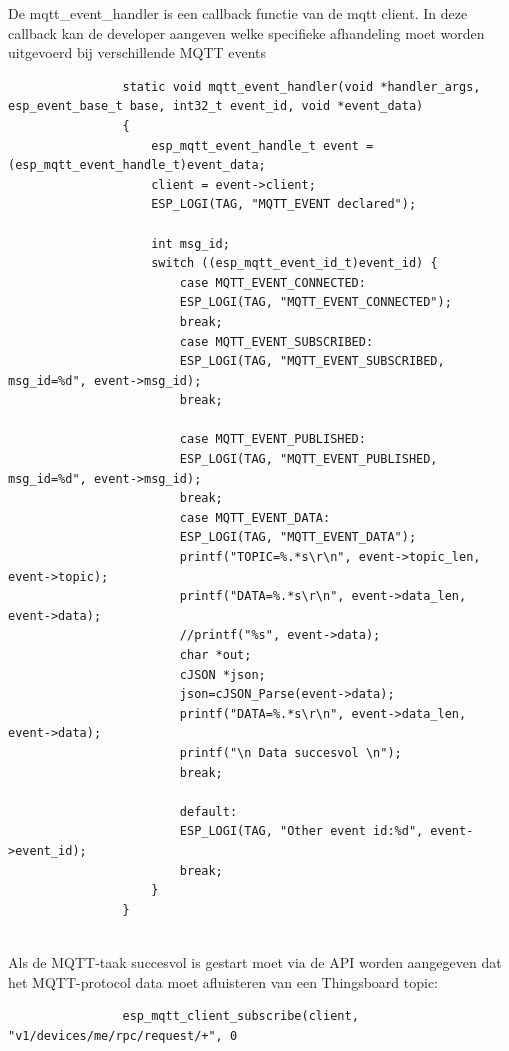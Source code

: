 		
		
		De mqtt_event_handler is een callback functie van de mqtt client. In deze callback kan de developer aangeven welke specifieke afhandeling moet worden uitgevoerd bij verschillende MQTT events
		
		
		
		\lstset{language=java}
		
		\begin{Aanpassen}
			\begin{lstlisting}
				static void mqtt_event_handler(void *handler_args, esp_event_base_t base, int32_t event_id, void *event_data)
				{
					esp_mqtt_event_handle_t event = (esp_mqtt_event_handle_t)event_data;
					client = event->client;
					ESP_LOGI(TAG, "MQTT_EVENT declared");
					
					int msg_id;
					switch ((esp_mqtt_event_id_t)event_id) {
						case MQTT_EVENT_CONNECTED:
						ESP_LOGI(TAG, "MQTT_EVENT_CONNECTED");
						break;
						case MQTT_EVENT_SUBSCRIBED:
						ESP_LOGI(TAG, "MQTT_EVENT_SUBSCRIBED, msg_id=%d", event->msg_id);
						break;
						
						case MQTT_EVENT_PUBLISHED:
						ESP_LOGI(TAG, "MQTT_EVENT_PUBLISHED, msg_id=%d", event->msg_id);
						break;
						case MQTT_EVENT_DATA:
						ESP_LOGI(TAG, "MQTT_EVENT_DATA");
						printf("TOPIC=%.*s\r\n", event->topic_len, event->topic);
						printf("DATA=%.*s\r\n", event->data_len, event->data);
						//printf("%s", event->data);
						char *out;
						cJSON *json;
						json=cJSON_Parse(event->data);
						printf("DATA=%.*s\r\n", event->data_len, event->data);
						printf("\n Data succesvol \n");
						break;
						
						default:
						ESP_LOGI(TAG, "Other event id:%d", event->event_id);
						break;
					}
				}
				
			\end{lstlisting}
		\end{Aanpassen}
		
		
		Als de MQTT-taak succesvol is gestart moet via de API worden aangegeven dat het MQTT-protocol data moet afluisteren van een Thingsboard topic:
		
		
		\lstset{language=java}
		
		\begin{Aanpassen}
			\begin{lstlisting}
				esp_mqtt_client_subscribe(client, "v1/devices/me/rpc/request/+", 0
				
				
			\end{lstlisting}
		\end{Aanpassen}
		
